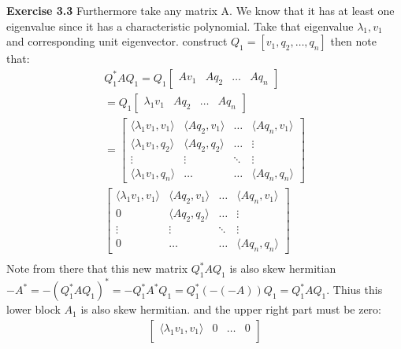 \documentclass[12pt]{article}
\newenvironment{exercise}[1]{\vspace{.1in}\noindent\textbf{Exercise #1 \hspace{.05em}}}{}
\theoremstyle{definition}
\theoremstyle{remark}
\begin{document}
\begin{exercise}{3.3}
	Furthermore take any matrix A. We know that it has at least one eigenvalue since it has a characteristic polynomial. Take that eigenvalue $\lambda_1, v_1$ and corresponding unit eigenvector. construct $Q_1=[v_1,q_2,\dots,q_n]$ then note that:
	\begin{align}
		Q_1^*AQ_1=Q_1 %
		\begin{bmatrix}
			Av_1 & Aq_2 & \dots & Aq_n
		\end{bmatrix}                                                                   \\
		=Q_1 %
		\begin{bmatrix}
			\lambda_1 v_1 & Aq_2 & \dots & Aq_n
		\end{bmatrix}                                                          \\
		=
		\begin{bmatrix}
			\langle \lambda_1v_1,v_1\rangle & \langle Aq_2,v_1\rangle & \dots  & \langle Aq_n,v_1\rangle \\
			\langle\lambda_1v_1,q_2\rangle  & \langle Aq_2,q_2\rangle & \dots  & \vdots                  \\
			\vdots                          & \vdots                  & \ddots & \vdots                  \\
			\langle\lambda_1v_1,q_n\rangle  & \dots                   & \dots  & \langle Aq_n,q_n\rangle
		\end{bmatrix} \\
		\begin{bmatrix}
			\langle \lambda_1v_1,v_1\rangle & \langle Aq_2,v_1\rangle & \dots  & \langle Aq_n,v_1\rangle \\
			0                               & \langle Aq_2,q_2\rangle & \dots  & \vdots                  \\
			\vdots                          & \vdots                  & \ddots & \vdots                  \\
			0                               & \dots                   & \dots  & \langle Aq_n,q_n\rangle
		\end{bmatrix} \\
	\end{align}
	Note from there that this new matrix $Q_1^*AQ_1$ is also skew hermitian $-A^*=-(Q_1^*AQ_1)^*=-Q_1^*A^*Q_1=Q_1^*(-(-A))Q_1=Q_1^*AQ_1$. Thius this lower block $A_1$ is also skew hermitian. and the upper right part must be zero:
	\begin{align}
		\begin{bmatrix}
			\langle \lambda_1v_1,v_1\rangle & 0                       & \dots  & 0                       \\

\end{bmatrix}
\end{align}
\end{exercise}
\end{document}
